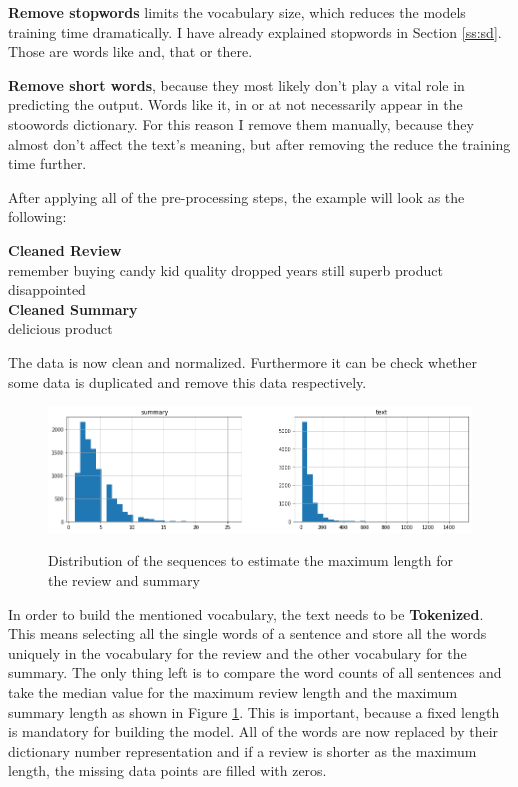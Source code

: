 \textbf{Remove stopwords} limits the vocabulary size, which reduces the models training time dramatically. I have already explained stopwords in Section \ref{ss:sd}. Those are words like and, that or there. 

\textbf{Remove short words}, because they most likely don't play a vital role in predicting the output. Words like it, in or at not necessarily appear in the stoowords dictionary. For this reason I remove them manually, because they almost don't affect the text's meaning, but after removing the reduce the training time further. 

After applying all of the pre-processing steps, the example will look as the following:

\begin{tcolorbox}
	\textbf{Cleaned Review} \\
	remember buying candy kid quality dropped years still superb product disappointed \\
	
	\textbf{Cleaned Summary} \\
	delicious product
\end{tcolorbox}

The data is now clean and normalized. Furthermore it can be check whether some data is duplicated and remove this data respectively. 

\begin{figure}
	\begin{center}
		\includegraphics[width=6in]{photos/dist_seq}\\
		\caption{Distribution of the sequences to estimate the maximum length for the review and summary}\label{dist_seq}
	\end{center}
\end{figure}

In order to build the mentioned vocabulary, the text needs to be \textbf{Tokenized}. This means selecting all the single words of a sentence and store all the words uniquely in the vocabulary for the review and the other vocabulary for the summary. The only thing left is to compare the word counts of all sentences and take the median value for the maximum review length and the maximum summary length as shown in Figure \ref{dist_seq}. This is important, because a fixed length is mandatory for building the model. All of the words are now replaced by their dictionary number representation and if a review is shorter as the maximum length, the missing data points are filled with zeros.

